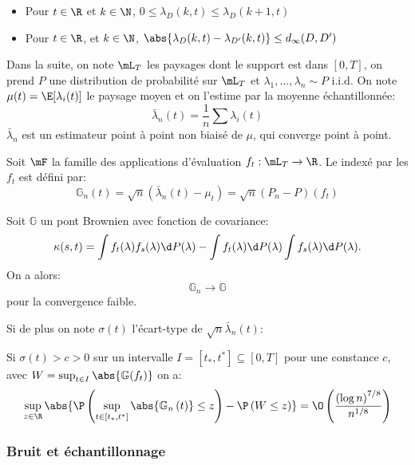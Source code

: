 \begin{proposition}
	\begin{itemize}
		\item Pour $t \in \R$ et $k \in \N$, $0 \leq \lambda_{D}(k, t) \leq \lambda_{D}(k + 1, t)$
		\item Pour $t \in \R$, et $k \in \N$, $\abs{\lambda_{D}(k, t) - \lambda_{D'}(k, t)} \leq \dinf(D, D')$
	\end{itemize}
\end{proposition}

Dans la suite, on note $\mL_{T}$ les paysages dont le support est dans $[0, T]$, on prend $P$ une distribution de probabilité
sur $\mL_{T}$ et $\lambda_{1}, \ldots, \lambda_{n} \sim P$ i.i.d.
On note $\mu(t) = \E[\lambda_{i}(t)]$ le paysage moyen et on l'estime par la moyenne échantillonnée:
\begin{equation*}
	\bar{\lambda}_{n}(t) = \frac{1}{n}\sum \lambda_{i}(t)
\end{equation*}
$\bar{\lambda}_{n}$ est un estimateur point à point non biaisé de $\mu$, qui converge point à point.

\begin{definition}
	Soit $\mF$ la famille des applications d'évaluation $f_{t} : \mL_{T} \to \R$.
	Le  indexé par les $f_{t}$ est défini par:
	\begin{equation*}
		\mathbb{G}_{n}(t) = \sqrt{n}(\bar{\lambda}_{n}(t) - \mu_{t}) = \sqrt{n}(P_{n} - P)(f_{t})
	\end{equation*}
\end{definition}

\begin{thm}
	Soit $\mathbb{G}$ un pont Brownien avec fonction de covariance:
	\begin{equation*}
		\kappa(s, t) = \int f_{t}(\lambda)f_{s}(\lambda)\d P(\lambda) - \int f_{t}(\lambda)\d P(\lambda)\int f_{s}(\lambda)\d P(\lambda).
	\end{equation*}
	On a alors:
	\begin{equation*}
		\mathbb{G}_{n} \to \mathbb{G}
	\end{equation*}
	pour la convergence faible.
\end{thm}

Si de plus on note $\sigma(t)$ l'écart-type de $\sqrt{n}\bar{\lambda}_{n}(t)$:
\begin{thm}
	Si $\sigma(t) > c > 0$ sur un intervalle $I = [t_{*}, t^{*}] \subseteq [0, T]$ pour une constance $c$, avec
	$W = \sup_{t \in I} \abs{\mathbb{G}(f_{t})}$ on a:
	\begin{equation*}
		\sup_{z \in \R}\abs{\P\left(\sup_{t \in [t_{*}, t^{*}]}\abs{\mathbb{G}_{n}\left(t\right)} \leq z\right) - \P\left(W \leq z\right)} = \O\left(\frac{\left(\log n\right)^{7 / 8}}{n^{1 / 8}}\right)
	\end{equation*}
\end{thm}

\subsubsection{Bruit et échantillonnage}
